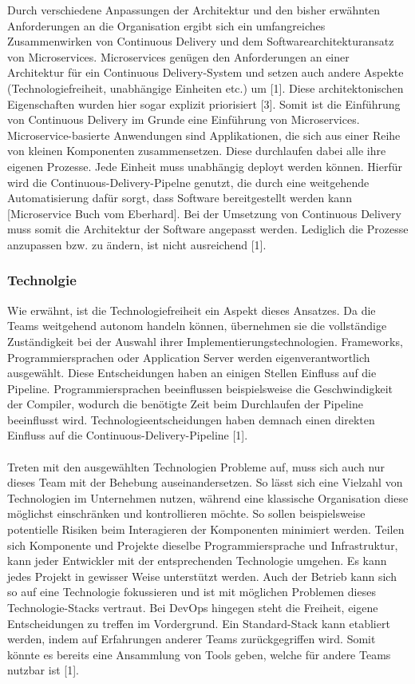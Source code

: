 Durch verschiedene Anpassungen der Architektur und den bisher erwähnten Anforderungen an die Organisation ergibt sich ein umfangreiches Zusammenwirken von Continuous Delivery und dem Softwarearchitekturansatz von Microservices. Microservices genügen den Anforderungen an einer Architektur für ein Continuous Delivery-System und setzen auch andere Aspekte (Technologiefreiheit, unabhängige Einheiten etc.) um [1]. Diese architektonischen Eigenschaften wurden hier sogar explizit priorisiert [3]. Somit ist die Einführung von Continuous Delivery im Grunde eine Einführung von Microservices. Microservice-basierte Anwendungen sind Applikationen, die sich aus einer Reihe von kleinen Komponenten zusammensetzen. Diese durchlaufen dabei alle ihre eigenen Prozesse. Jede Einheit muss unabhängig deployt werden können. Hierfür wird die Continuous-Delivery-Pipelne genutzt, die durch eine weitgehende Automatisierung dafür sorgt, dass Software bereitgestellt werden kann [Microservice Buch vom Eberhard]. Bei der Umsetzung von Continuous Delivery muss somit die Architektur der Software angepasst werden. Lediglich die Prozesse anzupassen bzw. zu ändern, ist nicht ausreichend [1].

\subsubsection{Technolgie}
Wie erwähnt, ist die Technologiefreiheit ein Aspekt dieses Ansatzes. Da die Teams weitgehend autonom handeln können, übernehmen sie die vollständige Zuständigkeit bei der Auswahl ihrer Implementierungstechnologien. Frameworks, Programmiersprachen oder Application Server werden eigenverantwortlich ausgewählt. Diese Entscheidungen haben an einigen Stellen Einfluss auf die Pipeline. Programmiersprachen beeinflussen beispielsweise die Geschwindigkeit der Compiler, wodurch die benötigte Zeit beim Durchlaufen der Pipeline beeinflusst wird. Technologieentscheidungen haben demnach einen direkten Einfluss auf die Continuous-Delivery-Pipeline [1].\\ \\
Treten mit den ausgewählten Technologien Probleme auf, muss sich auch nur dieses Team mit der Behebung auseinandersetzen. So lässt sich eine Vielzahl von Technologien im Unternehmen nutzen, während eine klassische Organisation diese möglichst einschränken und kontrollieren möchte. So sollen beispielsweise potentielle Risiken beim Interagieren der Komponenten minimiert werden. Teilen sich Komponente und Projekte dieselbe Programmiersprache und Infrastruktur, kann jeder Entwickler mit der entsprechenden Technologie umgehen. Es kann jedes Projekt in gewisser Weise unterstützt werden. Auch der Betrieb kann sich so auf eine Technologie fokussieren und ist mit möglichen Problemen dieses Technologie-Stacks vertraut. Bei DevOps hingegen steht die Freiheit, eigene Entscheidungen zu treffen im Vordergrund. Ein Standard-Stack kann etabliert werden, indem auf Erfahrungen anderer Teams zurückgegriffen wird. Somit könnte es bereits eine Ansammlung von Tools geben, welche für andere Teams nutzbar ist [1]. 


